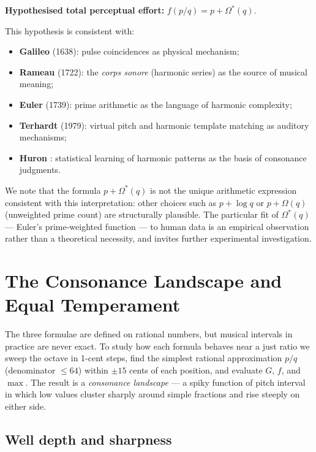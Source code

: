 \documentclass[11pt,a4paper]{article}
\newcommand{\Os}{\Omega^{\!*}}
\begin{document}
\medskip\noindent
\textbf{Hypothesised total perceptual effort:} $f(p/q) = p + \Os(q)$.

\medskip\noindent
This hypothesis is consistent with:
\begin{itemize}
  \item \textbf{Galileo} (1638): pulse coincidences as physical mechanism;
  \item \textbf{Rameau} (1722): the \emph{corps sonore} (harmonic series) as
        the source of musical meaning;
  \item \textbf{Euler} (1739): prime arithmetic as the language of harmonic
        complexity;
  \item \textbf{Terhardt} (1979): virtual pitch and harmonic template matching
        as auditory mechanisms;
  \item \textbf{Huron} \cite{huron2001}: statistical learning of harmonic patterns as
        the basis of consonance judgments.
\end{itemize}

\noindent
We note that the formula $p + \Os(q)$ is not the unique arithmetic expression
consistent with this interpretation: other choices such as $p + \log q$ or
$p + \Omega(q)$ (unweighted prime count) are structurally plausible. The
particular fit of $\Os(q)$ --- Euler's prime-weighted function --- to human
data is an empirical observation rather than a theoretical necessity, and
invites further experimental investigation.


\section{The Consonance Landscape and Equal Temperament}

The three formulae are defined on rational numbers, but musical intervals in
practice are never exact. To study how each formula behaves near a just ratio
we sweep the octave in 1-cent steps, find the simplest rational approximation
$p/q$ (denominator $\leq 64$) within $\pm 15$ cents of each position, and
evaluate $G$, $f$, and $\max$. The result is a \emph{consonance landscape}
--- a spiky function of pitch interval in which low values cluster sharply
around simple fractions and rise steeply on either side.

\subsection*{Well depth and sharpness}
\end{document}
